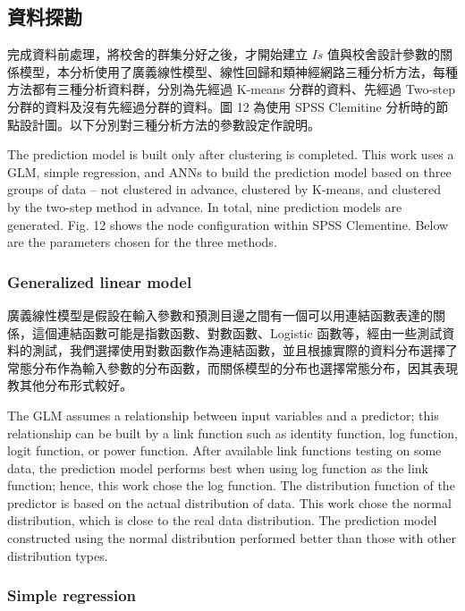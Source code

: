 \subsection{資料探勘}

完成資料前處理，將校舍的群集分好之後，才開始建立 $Is$ 值與校舍設計參數的關係模型，本分析使用了廣義線性模型、線性回歸和類神經網路三種分析方法，每種方法都有三種分析資料群，分別為先經過 K-means 分群的資料、先經過 Two-step 分群的資料及沒有先經過分群的資料。圖 12 為使用 SPSS Clemitine 分析時的節點設計圖。以下分別對三種分析方法的參數設定作說明。

The prediction model is built only after clustering is completed. This work uses a GLM, simple regression, and ANNs to build the prediction model based on three groups of data – not clustered in advance, clustered by K-means, and clustered by the two-step method in advance. In total, nine prediction models are generated. Fig. 12 shows the node configuration within SPSS Clementine. Below are the parameters chosen for the three methods. 

\subsubsection{Generalized linear model}

廣義線性模型是假設在輸入參數和預測目邊之間有一個可以用連結函數表達的關係，這個連結函數可能是指數函數、對數函數、Logistic 函數等，經由一些測試資料的測試，我們選擇使用對數函數作為連結函數，並且根據實際的資料分布選擇了常態分布作為輸入參數的分布函數，而關係模型的分布也選擇常態分布，因其表現教其他分布形式較好。

The GLM assumes a relationship between input variables and a predictor; this relationship can be built by a link function such as identity function, log function, logit function, or power function. After available link functions testing on some data, the prediction model performs best when using log function as the link function; hence, this work chose the log function. The distribution function of the predictor is based on the actual distribution of data. This work chose the normal distribution, which is close to the real data distribution. The prediction model constructed using the normal distribution performed better than those with other distribution types.

\subsubsection{Simple regression}

